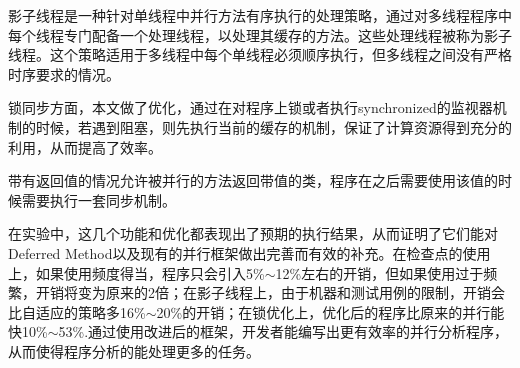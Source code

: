 影子线程是一种针对单线程中并行方法有序执行的处理策略，通过对多线程程序中每个线程专门配备一个处理线程，以处理其缓存的方法。这些处理线程被称为影子线程。这个策略适用于多线程中每个单线程必须顺序执行，但多线程之间没有严格时序要求的情况。

锁同步方面，本文做了优化，通过在对程序上锁或者执行synchronized的监视器机制的时候，若遇到阻塞，则先执行当前的缓存的机制，保证了计算资源得到充分的利用，从而提高了效率。

带有返回值的情况允许被并行的方法返回带值的类，程序在之后需要使用该值的时候需要执行一套同步机制。

在实验中，这几个功能和优化都表现出了预期的执行结果，从而证明了它们能对Deferred Method以及现有的并行框架做出完善而有效的补充。在检查点的使用上，如果使用频度得当，程序只会引入5\%$\sim$12\%左右的开销，但如果使用过于频繁，开销将变为原来的2倍；在影子线程上，由于机器和测试用例的限制，开销会比自适应的策略多16\%$\sim$20\%的开销；在锁优化上，优化后的程序比原来的并行能快10\%$\sim$53\%.通过使用改进后的框架，开发者能编写出更有效率的并行分析程序，从而使得程序分析的能处理更多的任务。
